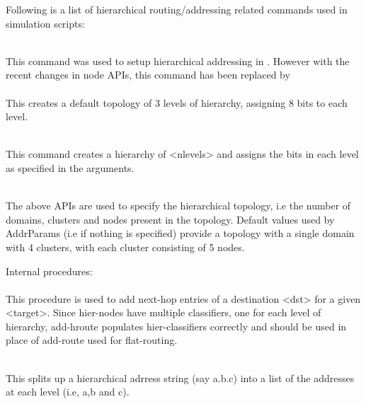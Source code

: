 Following is a list of hierarchical routing/addressing related commands
used in simulation scripts:
\begin{flushleft}
\\
This command was used to setup hierarchical addressing in \ns. However with
the recent changes in node APIs, this command has been replaced by\\
\\
This creates a default topology of 3 levels of hierarchy, assigning 8 bits
to each level.


\\
This command creates a hierarchy of <nlevels> and assigns the bits in each level
as specified in the arguments.


\\
The above APIs are used to specify the hierarchical topology, i.e the number of
domains, clusters and nodes present in the topology. Default values used by
AddrParams (i.e if nothing is specified) provide a topology with a single
domain with 4 clusters, with each cluster consisting of 5 nodes.


Internal procedures:\\

\\
This procedure is used to add next-hop entries of a destination <dst> for a
given <target>. Since hier-nodes have multiple classifiers, one for each level
of hierarchy, add-hroute populates hier-classifiers correctly and should be
used in place of add-route used for flat-routing.


\\
This splits up a hierarchical adrress string  (say a.b.c) into a list of
the addresses at each level (i.e, a,b and c).

\end{flushleft}

\endinput
